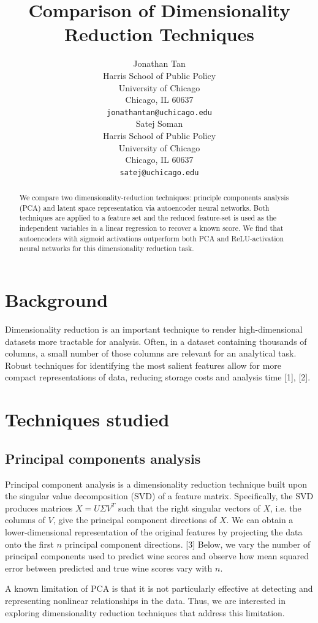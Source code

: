 \documentclass{article}
\title{Comparison of Dimensionality Reduction Techniques}
\author{%
  Jonathan Tan \\
  Harris School of Public Policy\\
  University of Chicago\\
  Chicago, IL 60637 \\
  \texttt{jonathantan@uchicago.edu} \\
  \And
  Satej Soman \\
  Harris School of Public Policy\\
  University of Chicago\\
  Chicago, IL 60637 \\
  \texttt{satej@uchicago.edu} \\
}
\begin{document}
\maketitle

\begin{abstract}
  We compare two dimensionality-reduction techniques: principle components analysis (PCA) and latent space representation via autoencoder neural networks. Both techniques are applied to a feature set and the reduced feature-set is used as the independent variables in a linear regression to recover a known score. We find that autoencoders with sigmoid activations outperform both PCA and ReLU-activation neural networks for this dimensionality reduction task. 
\end{abstract}

\section{Background}
Dimensionality reduction is an important technique to render high-dimensional datasets more tractable for analysis. Often, in a dataset containing thousands of columns, a small number of those columns are relevant for an analytical task. Robust techniques for identifying the most salient features allow for more compact representations of data, reducing storage costs and analysis time [1], [2].

\section{Techniques studied}
\subsection{Principal components analysis}
Principal component analysis is a dimensionality reduction technique built upon the singular value decomposition (SVD) of a feature matrix. Specifically, the SVD produces matrices $X = U \Sigma V^T$ such that the right singular vectors of $X$, i.e. the columns of $V$, give the principal component directions of $X$. We can obtain a lower-dimensional representation of the original features by projecting the data onto the first $n$ principal component directions. [3] Below, we vary the number of principal components used to predict wine scores and observe how mean squared error between predicted and true wine scores vary with $n$.

A known limitation of PCA is that it is not particularly effective at detecting and representing nonlinear relationships in the data. Thus, we are interested in exploring dimensionality reduction techniques that address this limitation.
\end{document}
